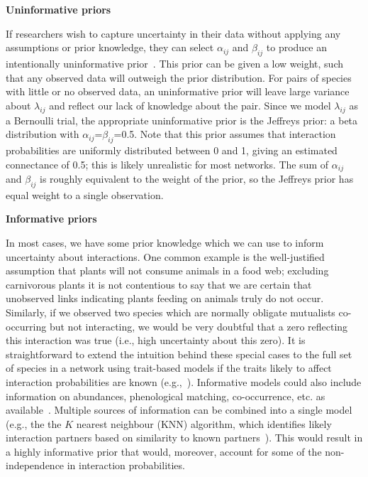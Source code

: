 \documentclass[12pt]{article}
\begin{document}
\begin{spacing}{2.0}
      \textbf{Uninformative priors}

        If researchers wish to capture uncertainty in their data without applying any assumptions or prior knowledge, they can select $\alpha_{ij}$ and $\beta_{ij}$ to produce an intentionally uninformative prior~\citep{Leyland2005,Berger2006}. This prior can be given a low weight, such that any observed data will outweigh the prior distribution. For pairs of species with little or no observed data, an uninformative prior will leave large variance about $\lambda_{ij}$ and reflect our lack of knowledge about the pair. Since we model $\lambda_{ij}$ as a Bernoulli trial, the appropriate uninformative prior is the Jeffreys prior: a beta distribution with $\alpha_{ij}$=$\beta_{ij}$=0.5. Note that this prior assumes that interaction probabilities are uniformly distributed between 0 and 1, giving an estimated connectance of 0.5; this is likely unrealistic for most networks. The sum of $\alpha_{ij}$ and $\beta_{ij}$ is roughly equivalent to the weight of the prior, so the Jeffreys prior has equal weight to a single observation. 


      \textbf{Informative priors}

        In most cases, we have some prior knowledge which we can use to inform uncertainty about interactions. One common example is the well-justified assumption that plants will not consume animals in a food web; excluding carnivorous plants it is not contentious to say that we are certain that unobserved links indicating plants feeding on animals truly do not occur. Similarly, if we observed two species which are normally obligate mutualists co-occurring but not interacting, we would be very doubtful that a zero reflecting this interaction was true (i.e., high uncertainty about this zero). It is straightforward to extend the intuition behind these special cases to the full set of species in a network using trait-based models if the traits likely to affect interaction probabilities are known (e.g.,~\citet{Gravel2013,Bartomeus2016,Weinstein2017}). Informative models could also include information on abundances, phenological matching, co-occurrence, etc. as available~\citep{Jordano2016,Weinstein2017a,Graham2018,Gravel2018}. Multiple sources of information can be combined into a single model (e.g., the the $K$ nearest neighbour (KNN) algorithm, which identifies likely interaction partners based on similarity to known partners~\citep{DesjardinsProulx2017}). This would result in a highly informative prior that would, moreover, account for some of the non-independence in interaction probabilities. 



\end{spacing}
\end{document}
